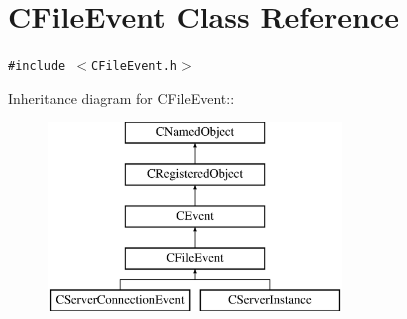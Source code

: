 \section{CFile\-Event  Class Reference}
\label{classCFileEvent}
{\tt \#include $<$CFile\-Event.h$>$}

Inheritance diagram for CFile\-Event::\begin{figure}[H]
\begin{center}
\leavevmode
\includegraphics[height=5cm]{classCFileEvent}
\end{center}
\end{figure}
